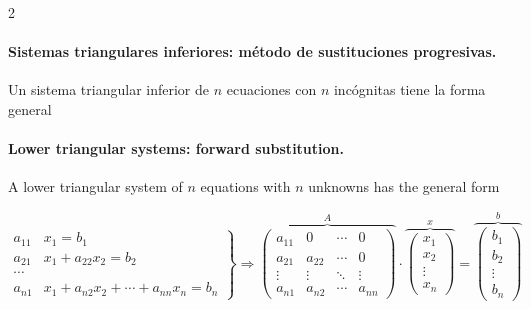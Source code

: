 \begin{paracol}{2}
\paragraph{Sistemas triangulares inferiores: método de sustituciones progresivas.} Un sistema triangular inferior de $n$ ecuaciones con $n$ incógnitas tiene la forma general
\switchcolumn
\paragraph{Lower triangular systems: forward substitution.} A lower triangular system of $n$ equations with $n$ unknowns has the general form
\end{paracol}

\begin{equation*}
\left. \begin{aligned}
a_{11}&x_1=b_1\\
a_{21}&x_1+a_{22}x_2=b_2\\
\cdots & \\
a_{n1}&x_1+a_{n2}x_2+\cdots +a_{nn}x_n=b_n
\end{aligned}\right\} \Rightarrow	\overbrace{\begin{pmatrix}
a_{11}& 0& \cdots & 0\\
a_{21}& a_{22}& \cdots & 0\\
\vdots & \vdots & \ddots & \vdots\\
a_{n1}& a_{n2}& \cdots & a_{nn}
\end{pmatrix}}^A \cdot \overbrace{\begin{pmatrix}
x_1\\
x_2\\
\vdots \\
x_n
\end{pmatrix}}^x=\overbrace{\begin{pmatrix}
b_1\\
b_2\\
\vdots \\
b_n
\end{pmatrix}}^b
\end{equation*}

